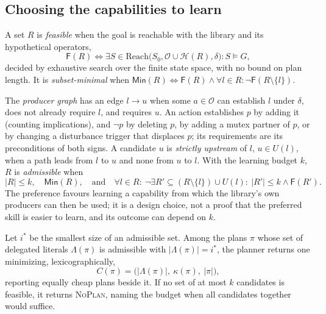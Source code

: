 \subsection{Choosing the capabilities to learn}
\label{sec:choice}

A set $R$ is \emph{feasible} when the goal is reachable with the library and its
hypothetical operators,
\begin{equation}
  \mathsf{F}(R)\iff \exists S\in\mathrm{Reach}\bigl(S_0,\mathcal{O}\cup\mathcal{H}(R),\delta\bigr): S\models G,
\end{equation}
decided by exhaustive search over the finite state space, with no bound on plan length.
It is \emph{subset-minimal} when
$\mathsf{Min}(R)\iff \mathsf{F}(R)\wedge\forall l\in R:\neg\mathsf{F}(R\setminus\{l\})$.

The \emph{producer graph} has an edge $l\to u$ when some $a\in\mathcal{O}$ can establish
$l$ under $\delta$, does not already require $l$, and requires $u$. An action establishes
$p$ by adding it (counting implications), and $\neg p$ by deleting $p$, by adding a mutex
partner of $p$, or by changing a disturbance trigger that displaces $p$; its requirements
are its preconditions of both signs. A candidate $u$ is \emph{strictly upstream} of $l$,
$u\in U(l)$, when a path leads from $l$ to $u$ and none from $u$ to $l$. With the
learning budget $k$, $R$ is \emph{admissible} when
\begin{equation}
  |R|\le k,\quad \mathsf{Min}(R),\quad\text{and}\quad
  \forall l\in R:\ \neg\exists R'\subseteq (R\setminus\{l\})\cup U(l):\ |R'|\le k\wedge\mathsf{F}(R').
\end{equation}
The preference favours learning a capability from which the library's own producers can
then be used; it is a design choice, not a proof that the preferred skill is easier to
learn, and its outcome can depend on $k$.

Let $i^\ast$ be the smallest size of an admissible set. Among the plans $\pi$ whose set
of delegated literals $\Lambda(\pi)$ is admissible with $|\Lambda(\pi)|=i^\ast$, the
planner returns one minimizing, lexicographically,
\begin{equation}
  C(\pi)=\bigl(|\Lambda(\pi)|,\ \kappa(\pi),\ |\pi|\bigr),
\end{equation}
reporting equally cheap plans beside it. If no set of at most $k$ candidates is feasible,
it returns \textsc{NoPlan}, naming the budget when all candidates together would suffice.

